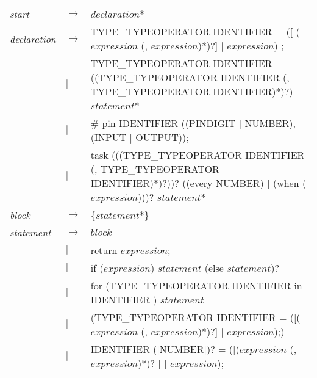 \begin{table}[htb!]
    \centering
    \begin{tabular}{ll>{\arraybackslash}p{10cm}}
        \textit{start}       & $\to$  & $declaration$*                                                                                                                            \\
        \textit{declaration} & $\to$  & TYPE\_TYPEOPERATOR IDENTIFIER = ([ ($expression$ (, $expression$)*)?] $\mid$ $expression$) ;                                              \\
                             & $\mid$ & TYPE\_TYPEOPERATOR IDENTIFIER ((TYPE\_TYPEOPERATOR IDENTIFIER (, TYPE\_TYPEOPERATOR IDENTIFIER)*)?) $statement$*                          \\
                             & $\mid$ & \# pin IDENTIFIER ((PINDIGIT $\mid$ NUMBER), (INPUT $\mid$ OUTPUT));                                                                      \\
                             & $\mid$ & task (((TYPE\_TYPEOPERATOR IDENTIFIER (, TYPE\_TYPEOPERATOR IDENTIFIER)*)?))? ((every NUMBER) $\mid$ (when ($expression$)))? $statement$* \\
        \textit{block}       & $\to$  & \{$statement$*\}                                                                                                                          \\
        \textit{statement}   & $\to$  & $block$                                                                                                                                   \\
                             & $\mid$ & return $expression$;                                                                                                                      \\
                             & $\mid$ & if ($expression$) $statement$ (else $statement$)?                                                                                         \\
                             & $\mid$ & for (TYPE\_TYPEOPERATOR IDENTIFIER in IDENTIFIER ) $statement$                                                                            \\
                             & $\mid$ & (TYPE\_TYPEOPERATOR IDENTIFIER = ([($expression$ (, $expression$)*)?] $\mid$ $expression$);)                                              \\
                             & $\mid$ & IDENTIFIER ([NUMBER])? = ([($expression$ (, $expression$)*)? ] $\mid$ $expression$);                                                      \\

\end{tabular}
\end{table}
